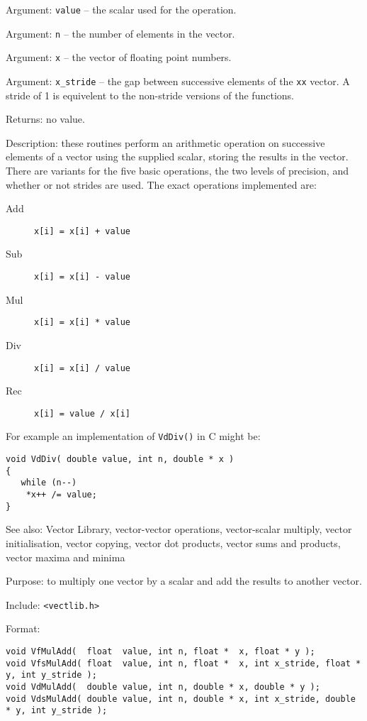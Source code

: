 Argument: {\tt value} -- the scalar used for the operation.

Argument: {\tt n} -- the number of elements in the vector.

Argument: {\tt x} -- the vector of floating point numbers.

Argument: \verb+x_stride+ -- the gap between successive elements of the
{\tt xx} vector.  A stride of 1 is equivelent to the non-stride
versions of the functions.

Returns: no value.

Description: these routines perform an arithmetic operation on
successive elements of a vector using the supplied scalar, storing the
results in the vector. There are variants for the five basic operations,
the two levels of precision, and whether or not strides are used. The
exact operations implemented are:

\begin{description}
\item [Add] \verb_x[i] = x[i] + value_
\item [Sub] \verb_x[i] = x[i] - value_
\item [Mul] \verb_x[i] = x[i] * value_
\item [Div] \verb_x[i] = x[i] / value_
\item [Rec] \verb_x[i] = value / x[i]_
\end{description}

For example an implementation of {\tt VdDiv()} in C might be:

\begin{verbatim}
void VdDiv( double value, int n, double * x )
{
   while (n--)
    *x++ /= value;
}
\end{verbatim}

See also: Vector Library, vector-vector operations, vector-scalar multiply,
vector initialisation, vector copying, vector dot products, vector sums and
products, vector maxima and minima

Purpose: to multiply one vector by a scalar and add the results to another
vector.

Include: \verb+<vectlib.h>+

Format:

\begin{verbatim}
void VfMulAdd(  float  value, int n, float *  x, float * y );
void VfsMulAdd( float  value, int n, float *  x, int x_stride, float *  y, int y_stride );
void VdMulAdd(  double value, int n, double * x, double * y );
void VdsMulAdd( double value, int n, double * x, int x_stride, double * y, int y_stride );
\end{verbatim}

